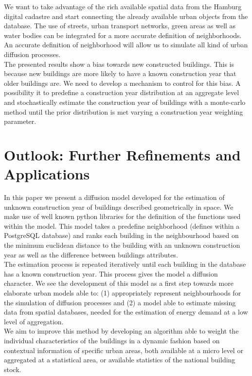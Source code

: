 We want to take advantage of the rich available spatial data from the Hamburg
digital cadastre and start connecting the already available urban objects from
the database. The use of streets, urban transport networks, green areas as well
as water bodies can be integrated for a more accurate definition of
neighborhoods. An accurate definition of neighborhood will allow us to simulate
all kind of urban diffusion processes.\\

The presented results show a bias towards new constructed buildings. This is
because new buildings are more likely to have a known construction year that
older buildings are. We need to develop a mechanism to control for this bias. A
possibility it to predefine a construction year distribution at an aggregate
level and stochastically estimate the construction year of buildings with a
monte-carlo method until the prior distribution is met varying a construction
year weighting parameter.\\

\section{Outlook: Further Refinements and Applications}

In this paper we present a diffusion model developed for the estimation of
unknown construction year of buildings described geometrically in space. We
make use of well known python libraries for the definition of the functions
used within the model. This model takes a predefine neighborhood (defines
within a PostgreSQL database) and ranks each building in the neighbourhood
based on the minimum euclidean distance to the building with an unknown
construction year as well as the difference between buildings attributes.\\

The estimation process is repeated iteratively until each building in the
database has a known construction year. This process gives the model a
diffusion character. We see the development of this model as a first step
towards more elaborate urban models able to: (1) appropriately represent
neighbourhoods for the simulation of diffusion processes and (2) a model able
to estimate missing data from spatial databases, needed for the estimation of
energy demand at a low level of aggregation.\\

We aim to improve this method by developing an algorithm able to weight the
individual characteristics of the buildings in a dynamic fashion based on
contextual information of specific urban areas, both available at a micro level
or aggregated at a statistical area, or available statistics of the national
building stock.\\

